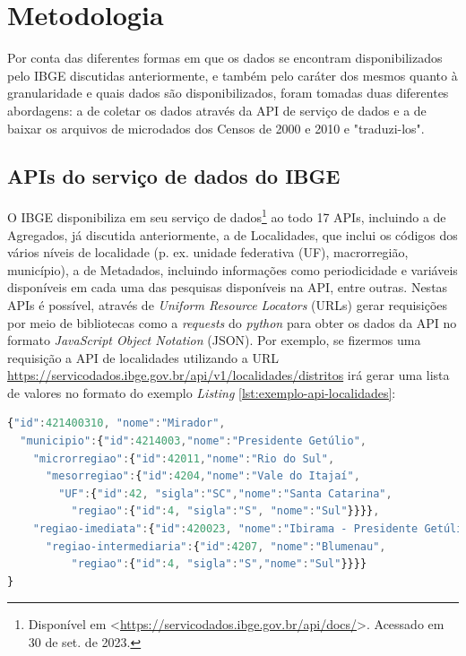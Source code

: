 \chapter{Metodologia}

    Por conta das diferentes formas em que os dados se encontram disponibilizados pelo IBGE discutidas anteriormente, e também pelo caráter dos mesmos quanto à granularidade e quais dados são disponibilizados, foram tomadas duas diferentes abordagens: a de coletar os dados através da API de serviço de dados e a de baixar os arquivos de microdados dos Censos de 2000 e 2010 e "traduzi-los".

\section{APIs do serviço de dados do IBGE}

    O IBGE disponibiliza em seu serviço de dados\footnote{Disponível em <\url{https://servicodados.ibge.gov.br/api/docs/}>. Acessado em 30 de set. de 2023.} ao todo 17 APIs, incluindo a de Agregados, já discutida anteriormente, a de Localidades, que inclui os códigos dos vários níveis de localidade (p. ex. unidade federativa (UF), macrorregião, município), a de Metadados, incluindo informações como periodicidade e variáveis disponíveis em cada uma das pesquisas disponíveis na API, entre outras. Nestas APIs é possível, através de \textit{Uniform Resource Locators} (URLs) gerar requisições por meio de bibliotecas como a \textit{requests} do \textit{python} para obter os dados da API no formato \textit{JavaScript Object Notation} (JSON). Por exemplo, se fizermos uma requisição a API de localidades utilizando a URL \url{https://servicodados.ibge.gov.br/api/v1/localidades/distritos} irá gerar uma lista de valores no formato do exemplo \textit{Listing} \ref{lst:exemplo-api-localidades}:

    \bigskip
    
\begin{lstlisting}[float = h, label={lst:exemplo-api-localidades},language=JavaScript, caption=Exemplo de resultado de uma requisição da API de localidades.]
{"id":421400310, "nome":"Mirador",
  "municipio":{"id":4214003,"nome":"Presidente Getúlio",
    "microrregiao":{"id":42011,"nome":"Rio do Sul",
      "mesorregiao":{"id":4204,"nome":"Vale do Itajaí",
        "UF":{"id":42, "sigla":"SC","nome":"Santa Catarina",
          "regiao":{"id":4, "sigla":"S", "nome":"Sul"}}}},
    "regiao-imediata":{"id":420023, "nome":"Ibirama - Presidente Getúlio",
      "regiao-intermediaria":{"id":4207, "nome":"Blumenau",
          "regiao":{"id":4, "sigla":"S","nome":"Sul"}}}}
}
\end{lstlisting}


